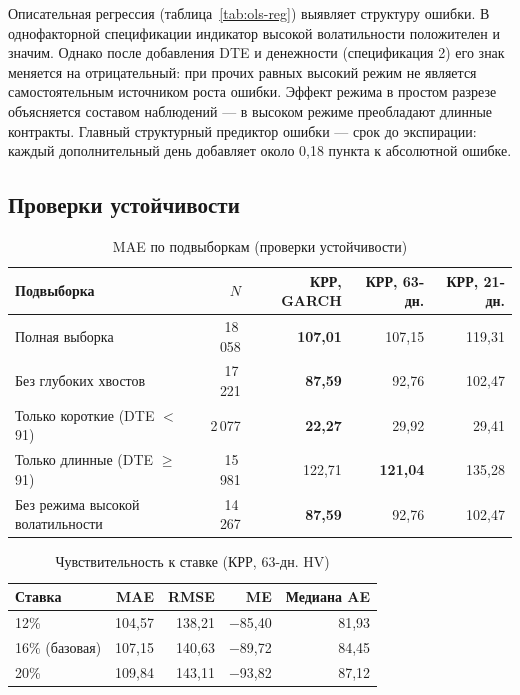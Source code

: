 \documentclass[11pt,a4paper]{article}
\begin{document}
Описательная регрессия (таблица~\ref{tab:ols-reg}) выявляет структуру ошибки. В однофакторной спецификации индикатор высокой волатильности положителен и значим. Однако после добавления DTE и денежности (спецификация 2) его знак меняется на отрицательный: при прочих равных высокий режим не является самостоятельным источником роста ошибки. Эффект режима в простом разрезе объясняется составом наблюдений --- в высоком режиме преобладают длинные контракты. Главный структурный предиктор ошибки --- срок до экспирации: каждый дополнительный день добавляет около 0,18 пункта к абсолютной ошибке.

\subsection{Проверки устойчивости}

\begin{table}[H]
\centering
\caption{MAE по подвыборкам (проверки устойчивости)}
\label{tab:robustness}
\small
\begin{tabular}{lrrrr}
\toprule
Подвыборка & $N$ & КРР, GARCH & КРР, 63-дн. & КРР, 21-дн. \\
\midrule
Полная выборка             & 18\,058 & \textbf{107,01} & 107,15 & 119,31 \\
Без глубоких хвостов       & 17\,221 & \textbf{87,59}  & 92,76  & 102,47 \\
Только короткие (DTE $<$ 91) &  2\,077 & \textbf{22,27}  & 29,92  & 29,41  \\
Только длинные (DTE $\geq$ 91) & 15\,981 & 122,71 & \textbf{121,04} & 135,28 \\
Без режима высокой волатильности & 14\,267 & \textbf{87,59}  & 92,76  & 102,47 \\
\bottomrule
\end{tabular}
\end{table}

\begin{table}[H]
\centering
\caption{Чувствительность к ставке (КРР, 63-дн. HV)}
\label{tab:rate-sensitivity}
\small
\begin{tabular}{lrrrr}
\toprule
Ставка & MAE & RMSE & ME & Медиана AE \\
\midrule
12\% & 104,57 & 138,21 & $-$85,40 & 81,93 \\
16\% (базовая) & 107,15 & 140,63 & $-$89,72 & 84,45 \\
20\% & 109,84 & 143,11 & $-$93,82 & 87,12 \\
\bottomrule
\end{tabular}
\end{table}
\end{document}
